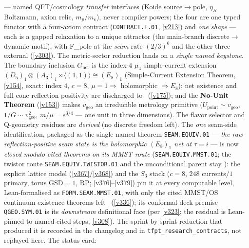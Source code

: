 \documentclass[11pt,a4paper]{article}
\begin{document}
--- named QFT/cosmology \emph{transfer} interfaces (Koide source$\to$pole, $\eta_B$ Boltzmann, axion relic,
$m_p/m_e$), never compiler powers; the four are one typed functor with a four-axiom contract
(\texttt{CONTRACT.F.01}, \vref{v213}) and \emph{one shape} --- each is a gapped relaxation to a unique attractor
(the main-branch discrete$\to$dynamic motif), with F\_pole at the \emph{seam} rate $(2/3)^6$ and the other three
external (\vref{v303}). The metric-sector reduction lands on a \emph{single named keystone}. The boundary inclusion
$G_{\mathrm{net}}$ is the index-$4$ $\mu_4$ simple-current extension
$(D_5)_1{\otimes}(A_3)_1{\rtimes}\langle(1,1)\rangle\cong(E_8)_1$ (Simple-Current Extension Theorem,
\vref{v154}, exact: index $4$, $c{=}8$, $\mu{=}1\Rightarrow$ holomorphic $\Rightarrow E_8$); net
existence and full-cone reflection positivity are discharged to \mE\ (\vref{v175}); and the
\textbf{No-Unit Theorem} (\vref{v153}) makes $v_{\mathrm{geo}}$ an irreducible metrology primitive
($U_{\mathrm{point}}\sim v_{\mathrm{geo}}$, $1/G\sim v_{\mathrm{geo}}^2$, $m/\mu=e^{3/4}$ --- one unit in
three dimensions). The flavor selector and Q-geometry residues are \emph{derived} (no discrete freedom
left). The \emph{one} seam-side identification, packaged as the single named
theorem \texttt{SEAM.EQUIV.01} --- \emph{the raw reflection-positive seam state is the holomorphic
$(E_8)_1$ net at $\tau{=}i$} --- is now \emph{closed modulo cited theorems on its MMST route}
(\texttt{SEAM.EQUIV.MMST.01}; the twistor route \texttt{SEAM.EQUIV.TWISTOR.01} and the unconditional parent stay
\mO): the explicit lattice model
(\vref{v367}/\vref{v368}) and the $S_3$ stack ($c{=}8$, $248$ currents/$1$ primary, torus $\mathrm{GSD}{=}1$, RP;
\vref{v376}--\vref{v379}) pin it at every computable level, Lean-formalised as \texttt{FORM.SEAM.MMST.01}, with only
the cited MMST/OS continuum-existence theorems left \mO\ (\vref{v336}); its conformal-deck premise
\texttt{QGEO.SYM.01} is its \emph{downstream} definitional face (per \vref{v323}; the residual is Lean-pinned to named
cited steps, \vref{v308}). The
sprint-by-sprint reduction that produced it is recorded in the changelog and in
\texttt{tfpt\_research\_contracts}, not replayed here.
The status card:
\end{document}
